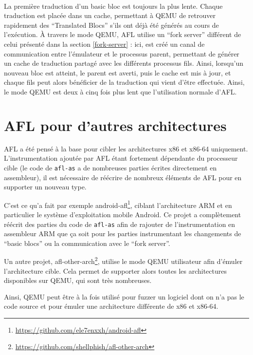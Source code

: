 \paragraph{}
La première traduction d'un basic bloc est toujours la plus lente.
Chaque traduction est placée dans un cache, permettant à QEMU de retrouver rapidement des ``Translated Blocs'' s'ils ont déjà été générés au cours de l'exécution.
À travers le mode QEMU, AFL utilise un ``fork server'' différent de celui présenté dans la section \ref{fork-server} : ici, est créé un canal de communication entre l'émulateur et le processus parent, permettant de générer un cache de traduction partagé avec les différents processus fils.
Ainsi, lorsqu'un nouveau bloc est atteint, le parent est averti, puis le cache est mis à jour, et chaque fils peut alors bénéficier de la traduction qui vient d'être effectuée.
Ainsi, le mode QEMU est deux à cinq fois plus lent que l'utilisation normale d'AFL.

\section{AFL pour d'autres architectures}

AFL a été pensé à la base pour cibler les architectures x86 et x86-64 uniquement.
L'instrumentation ajoutée par AFL étant fortement dépendante du processeur cible (le code de \lstinline{afl-as} a de nombreuses parties écrites directement en assembleur), il est nécessaire de réécrire de nombreux éléments de AFL pour en supporter un nouveau type.

C'est ce qu'a fait par exemple android-afl\footnote{\url{https://github.com/ele7enxxh/android-afl}}, ciblant l'architecture ARM et en particulier le système d'exploitation mobile Android.
Ce projet a complètement réécrit des parties du code de \lstinline{afl-as} afin de rajouter de l'instrumentation en assembleur ARM que ça soit pour les parties instrumentant les changements de ``basic blocs'' ou la communication avec le ``fork server''.

Un autre projet, afl-other-arch\footnote{\url{https://github.com/shellphish/afl-other-arch}}, utilise le mode QEMU utilisateur afin d'émuler l'architecture cible.
Cela permet de supporter alors toutes les architectures disponibles sur QEMU, qui sont très nombreuses.

Ainsi, QEMU peut être à la fois utilisé pour fuzzer un logiciel dont on n'a pas le code source et pour émuler une architecture différente de x86 et x86-64.
